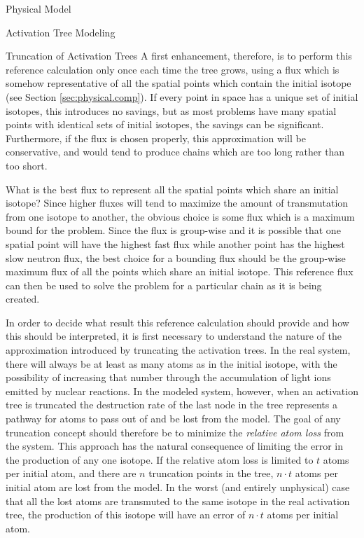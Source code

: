 \begin{chapter}{Physical Model\label{chap:physical}}
\begin{section}{Activation Tree Modeling\label{sec:physical.chains}}
\begin{subsection}{Truncation of Activation Trees}
    A first enhancement, therefore, is to perform this reference
    calculation only once each time the tree grows, using a flux which
    is somehow representative of all the spatial points which contain
    the initial isotope (see Section \ref{sec:physical.comp}). If
    every point in space has a unique set of initial isotopes, this
    introduces no savings, but as most problems have many spatial
    points with identical sets of initial isotopes, the savings can be
    significant.  Furthermore, if the flux is chosen properly, this
    approximation will be conservative, and would tend to produce
    chains which are too long rather than too short.
    
    What is the best flux to represent all the spatial points which
    share an initial isotope?  Since higher fluxes will tend to
    maximize the amount of transmutation from one isotope to another,
    the obvious choice is some flux which is a maximum bound for the
    problem.  Since the flux is group-wise and it is possible that one
    spatial point will have the highest fast flux while another point
    has the highest slow neutron flux, the best choice for a bounding
    flux should be the group-wise maximum flux of all the points which
    share an initial isotope.  This reference flux can then be used to
    solve the problem for a particular chain as it is being created.
    
    In order to decide what result this reference calculation should
    provide and how this should be interpreted, it is first necessary
    to understand the nature of the approximation introduced by
    truncating the activation trees.  In the real system, there will
    always be at least as many atoms as in the initial isotope, with
    the possibility of increasing that number through the accumulation
    of light ions emitted by nuclear reactions.  In the modeled
    system, however, when an activation tree is truncated the
    destruction rate of the last node in the tree represents a pathway
    for atoms to pass out of and be lost from the model.  The goal of
    any truncation concept should therefore be to minimize the
    \textsl{relative atom loss} from the system.  This approach has
    the natural consequence of limiting the error in the production of
    any one isotope.  If the relative atom loss is limited to $t$
    atoms per initial atom, and there are $n$ truncation points in the
    tree, $n\cdot t$ atoms per initial atom are lost from the model.
    In the worst (and entirely unphysical) case that all the lost
    atoms are transmuted to the same isotope in the real activation
    tree, the production of this isotope will have an error of $n
    \cdot t$ atoms per initial atom.
    

\end{subsection}
\end{section}
\end{chapter}
